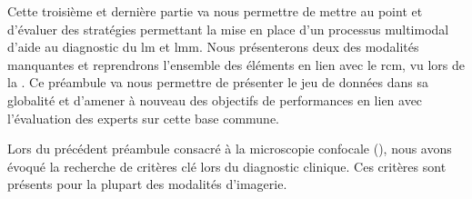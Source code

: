 \renewcommand{\thechapter}{\roman{chapter}}
\setcounter{chapter}{4}
\setcounter{figure}{0}

\label{chap:preamble_multimodal}
Cette troisième et dernière partie va nous permettre de mettre au point et d'évaluer des stratégies permettant la mise en place d'un processus multimodal d'aide au diagnostic du \gls{lm} et \gls{lmm}. Nous présenterons deux des modalités manquantes et reprendrons l'ensemble des éléments en lien avec le \gls{rcm}, vu lors de la . Ce préambule va nous permettre de présenter le jeu de données dans sa globalité et d'amener à nouveau des objectifs de performances en lien avec l'évaluation des experts sur cette base commune.\par


Lors du précédent préambule consacré à la microscopie confocale (), nous avons évoqué la recherche de critères clé lors du diagnostic clinique. Ces critères sont présents pour la plupart des modalités d'imagerie.
